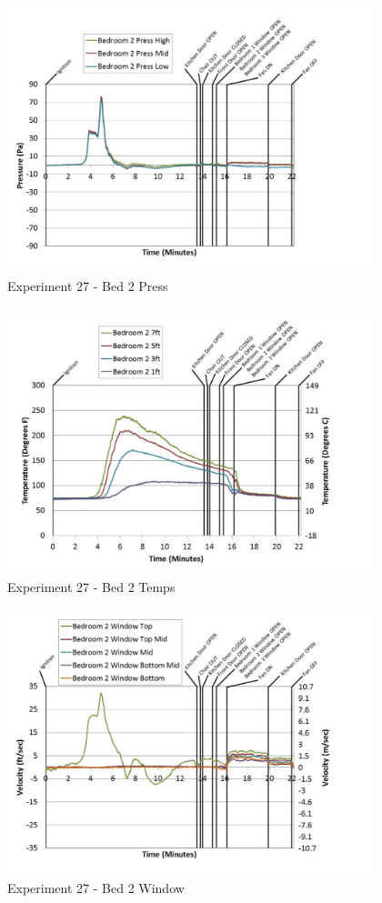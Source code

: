 \documentclass{article}
\begin{document}
\begin{appendices}
	\clearpage

	\begin{figure}[h!]
		\centering
		\includegraphics[height=3.05in]{0_Images/Results_Charts/Exp_27_Charts/Bed2Press.pdf}
		\caption{Experiment 27 - Bed 2 Press}
	\end{figure}
 

	\begin{figure}[h!]
		\centering
		\includegraphics[height=3.05in]{0_Images/Results_Charts/Exp_27_Charts/Bed2Temps.pdf}
		\caption{Experiment 27 - Bed 2 Temps}
	\end{figure}
 
	\clearpage

	\begin{figure}[h!]
		\centering
		\includegraphics[height=3.05in]{0_Images/Results_Charts/Exp_27_Charts/Bed2Window.pdf}
		\caption{Experiment 27 - Bed 2 Window}
	\end{figure}
 


\end{appendices}
\end{document}
